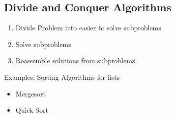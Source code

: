 \subsection{Divide and Conquer Algorithms}
    \begin{enumerate}
        \item Divide Problem into easier to solve subproblems
        \item Solve subproblems
        \item Reassemble solutions from subproblems
    \end{enumerate}
    Examples: Sorting Algorithms for lists
    \begin{itemize}
        \item Mergesort
        \item Quick Sort
    \end{itemize}
    